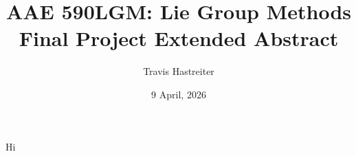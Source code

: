 \documentclass[titlepage]{article}
\title{\textbf{AAE 590LGM: Lie Group Methods} \\ Final Project Extended Abstract}
\author{Travis Hastreiter}
\date{9 April, 2026}
\numberwithin{equation}{section}
\begin{document}
\maketitle
\newpage

Hi
\end{document}
